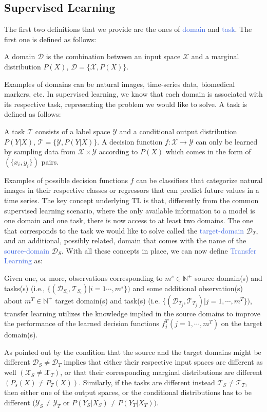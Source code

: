 \subsection{Supervised Learning}
The first two definitions that we provide are the ones of \textcolor{RoyalBlue}{domain} and \textcolor{RoyalBlue}{task}. The first one is defined as follows:
\begin{definition}
	A domain $\mathcal{D}$ is the combination between an input space $\mathcal{X}$ and a marginal distribution $P(X)$, $\mathcal{D} = \{\mathcal{X},P(X)\}$.
\end{definition}
Examples of domains can be natural images, time-series data, biomedical markers, etc. In supervised learning, we know that each domain is associated with its respective task, representing the problem we would like to solve. A task is defined as follows:
\begin{definition}
	A task $\mathcal{T}$ consists of a label space $\mathcal{Y}$ and a conditional output distribution $P(Y|X)$, $\mathcal{T}=\{\mathcal{Y},P(Y|X)\}$. A decision function $f:\mathcal{X}\rightarrow\mathcal{Y}$ can only be learned by sampling data from $\mathcal{X}\times\mathcal{Y}$ according to $P(X)$ which comes in the form of $(\{x_i,y_i \})$ pairs.
\end{definition}
Examples of possible decision functions $f$ can be classifiers that categorize natural images in their respective classes or regressors that can predict future values in a time series. 
The key concept underlying TL is that, differently from the common supervised learning scenario,
where the only available information to a model is one domain and one task, there is now access to at least two domains. The one that corresponds to the task we would like to solve called the \textcolor{RoyalBlue}{target-domain} $\mathcal{D}_T$, and an additional, possibly related, domain that comes with the name of the \textcolor{RoyalBlue}{source-domain} $\mathcal{D}_S$. With all these concepts in place, we can now define \textcolor{RoyalBlue}{Transfer Learning} as:
\begin{definition}
Given one, or more, observations corresponding to $m^s \in \mathds{N}^{+}$ source domain(s) and tasks(s) (i.e., $\{(\mathcal{D}_{S_{i}}, \mathcal{T}_{S_{i}})|i=1\cdots,m^s\})$ and some additional observation(s) about $m^T \in \mathds{N}^{+}$ target domain(s) and task(s) (i.e. $\{(\mathcal{D}_{T_{j}},\mathcal{T}_{T_{j}})|j=1,\cdots,m^T\})$, transfer learning utilizes the knowledge implied in the source domains to improve the performance of the learned decision functions $f^{T}_j(j=1,\cdots,m^T)$ on the target domain(s).
\end{definition}
As pointed out by \citet{pan2009survey} the condition that the source and the target domains might be different $\mathcal{D}_S \neq \mathcal{D}_T$ implies that either their respective input spaces are different as well $(\mathcal{X}_S\neq\mathcal{X}_T)$, or that their corresponding marginal distributions are different $(P_s(X)\neq P_T(X))$. Similarly, if the tasks are different instead $\mathcal{T}_S\neq\mathcal{T}_T$, then either one of the output spaces, or the conditional distributions has to be different ($\mathcal{Y}_S\neq\mathcal{Y}_T$ or $P(Y_S|X_S)\neq P(Y_T|X_T))$.

